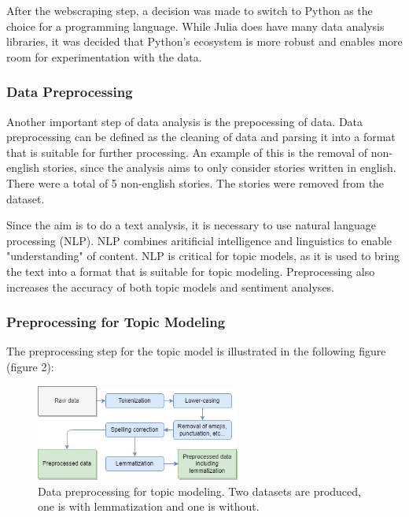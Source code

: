 After the webscraping step, a decision was made to switch to Python as the choice for a programming language. While Julia does have many data analysis libraries, it was decided that Python's ecosystem is more robust and enables more room for experimentation with the data. 

\subsubsection{Data Preprocessing}

Another important step of data analysis is the prepocessing of data. Data preprocessing can be defined as the cleaning of data and parsing it into a format that is suitable for further processing. An example of this is the removal of non-english stories, since the analysis aims to only consider stories written in english. There were a total of 5 non-english stories. The stories were removed from the dataset.

Since the aim is to do a text analysis, it is necessary to use natural language processing (NLP). NLP combines aritificial intelligence and linguistics to enable "understanding" of content. NLP is critical for topic models, as it is used to bring the text into a format that is suitable for topic modeling. Preprocessing also increases the accuracy of both topic models and sentiment analyses.~\cite{haddi2013role}\cite{chauhan2021topic}

\subsubsection*{Preprocessing for Topic Modeling}

The preprocessing step for the topic model is illustrated in the following figure (figure 2):

\begin{figure}[h]
    \centering
    \includegraphics[width=0.6\textwidth]{resources/preprocessing_topic_modeling.png}
    \caption{Data preprocessing for topic modeling. Two datasets are produced, one is with lemmatization and one is without.}
    \label{fig:preprocessing_topic_modeling}
\end{figure}

